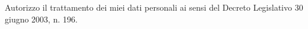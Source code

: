 \documentclass[a4paper,helvetica,flagCMYK,italian]{europecv}
\begin{document}
\begin{europecv}
 \ecvpersonalinfo






\end{europecv}



Autorizzo il trattamento dei miei dati personali ai sensi del Decreto Legislativo 30 giugno 2003, n. 196.
\end{document}
